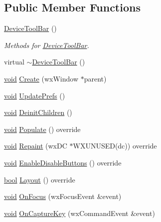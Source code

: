 \subsection*{Public Member Functions}
\begin{DoxyCompactItemize}
\item 
\hyperlink{class_device_tool_bar_a516aa06a68f73ac64ab95d4a5e9b8b67}{Device\+Tool\+Bar} ()
\begin{DoxyCompactList}\small\item\em Methods for \hyperlink{class_device_tool_bar}{Device\+Tool\+Bar}. \end{DoxyCompactList}\item 
virtual \hyperlink{class_device_tool_bar_ab728d91c4f5abd28b99344d14c6da501}{$\sim$\+Device\+Tool\+Bar} ()
\item 
\hyperlink{sound_8c_ae35f5844602719cf66324f4de2a658b3}{void} \hyperlink{class_device_tool_bar_a39d52d9f58a27fbde9d45427194112f7}{Create} (wx\+Window $\ast$parent)
\item 
\hyperlink{sound_8c_ae35f5844602719cf66324f4de2a658b3}{void} \hyperlink{class_device_tool_bar_a7eaec9a6fb8de87542542babff267a8b}{Update\+Prefs} ()
\item 
\hyperlink{sound_8c_ae35f5844602719cf66324f4de2a658b3}{void} \hyperlink{class_device_tool_bar_a4e1083adfdf6eca3ddaf9d366eaad988}{Deinit\+Children} ()
\item 
\hyperlink{sound_8c_ae35f5844602719cf66324f4de2a658b3}{void} \hyperlink{class_device_tool_bar_a20f5440cf0969ea8554bb1f9fe6d3290}{Populate} () override
\item 
\hyperlink{sound_8c_ae35f5844602719cf66324f4de2a658b3}{void} \hyperlink{class_device_tool_bar_aef9f403ad34342d36d1a32816a555167}{Repaint} (wx\+DC $\ast$W\+X\+U\+N\+U\+S\+ED(dc)) override
\item 
\hyperlink{sound_8c_ae35f5844602719cf66324f4de2a658b3}{void} \hyperlink{class_device_tool_bar_a33aaa6203f7da9cb05cda309f205f0ad}{Enable\+Disable\+Buttons} () override
\item 
\hyperlink{mac_2config_2i386_2lib-src_2libsoxr_2soxr-config_8h_abb452686968e48b67397da5f97445f5b}{bool} \hyperlink{class_device_tool_bar_aa0b910077ecf3d6774353816717de9b2}{Layout} () override
\item 
\hyperlink{sound_8c_ae35f5844602719cf66324f4de2a658b3}{void} \hyperlink{class_device_tool_bar_a3882065bd34599c5127abe39633b7098}{On\+Focus} (wx\+Focus\+Event \&event)
\item 
\hyperlink{sound_8c_ae35f5844602719cf66324f4de2a658b3}{void} \hyperlink{class_device_tool_bar_a2207d203ea4a004af43a33952b71ed57}{On\+Capture\+Key} (wx\+Command\+Event \&event)

\end{DoxyCompactItemize}
